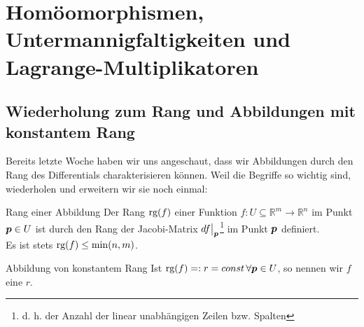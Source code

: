 \section[Untermannigfaltigkeiten, Lagrange-Multiplikatoren]{Homöomorphismen, Untermannigfaltigkeiten und Lagrange-Multiplikatoren}

\subsection{Wiederholung zum Rang und Abbildungen mit konstantem Rang}
Bereits letzte Woche haben wir uns angeschaut, dass wir Abbildungen durch den Rang des Differentials charakterisieren können. Weil die Begriffe so wichtig sind, wiederholen und erweitern wir sie noch einmal:
\begin{Wiederholung}{Rang einer Abbildung}
Der Rang $\text{rg}(f)$ einer Funktion $f:U\subseteq\mathbb{R}^m\to\mathbb{R}^n$ im Punkt ${{\text{\boldmath${p}$}}}\in U$ ist durch den Rang der Jacobi-Matrix $df\big|_{{\text{\boldmath${p}$}}}$\footnote{d. h. der Anzahl der linear unabhängigen Zeilen bzw. Spalten} im Punkt ${{\text{\boldmath${p}$}}}$ definiert.\\
Es ist stets $\text{rg}(f)\leq\min(n,m)$.
\end{Wiederholung}
\begin{Def}
{Abbildung von konstantem Rang}
Ist $\text{rg}(f)=:r=const\,\forall {{\text{\boldmath${p}$}}}\in U$, so nennen wir $f$ eine  $r$. 
\end{Def}
